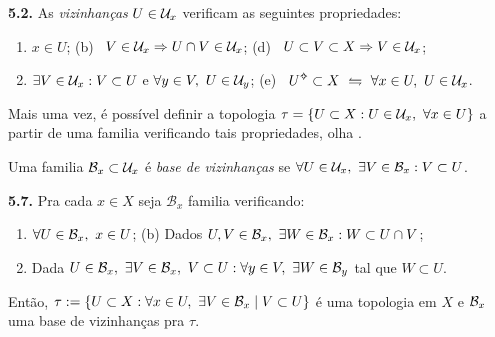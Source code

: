 \hypertarget{prop52}{}
\begin{proposition}
    \textbf{5.2.} As \emph{vizinhanças} \(U \in \mathcal{U}_x\) verificam as seguintes propriedades: 
\vspace{-0.2cm}
    \begin{enumerate}[label = (\alph*), left = 0.6cm]
        \item \(x \in U\); \hfill  (b) \ \( V \in \mathcal{U}_x \Rightarrow U\cap V \in \mathcal{U}_x\); \hfill (d) \ \(U \subset V\subset X \Rightarrow V \in \mathcal{U}_x\);
        \item[(c)] \(\exists V \in \mathcal{U}_x : V\subset U\) e \(\forall y \in V, \ U \in \mathcal{U}_y\); \hfill (e) \  \(U\ab\subset X \ \leftrightharpoons \ \forall x \in U, \  U \in \U_x\). 
    \end{enumerate}
\end{proposition}
\begin{note}
    Mais uma vez, é possível definir a topologia \(\tau = \{U \subset X : U \in \mathcal{U}_x, \ \forall x \in U\}\) a partir de uma familia verificando tais propriedades, olha \cite[pag. 12]{mujica2005}.
\end{note}

\begin{definition}
    Uma familia \(\mathcal{B}_x\subset \mathcal{U}_x\) é \emph{base de vizinhanças} se \(\forall U \in \mathcal{U}_x, \ \exists V \in \mathcal{B}_x : V \subset U\). 
\end{definition}

\begin{proposition}
    \textbf{5.7.} Pra cada \(x \in X \) seja \(\mathcal{B}_x\) familia verificando: 
    \vspace{-0.2cm}
    \begin{enumerate}[label = (\alph*), left = 0.6cm ]
        \item \(\forall U \in \mathcal{B}_x, \ x \in U\); \hfill (b) Dados \(U,V \in \mathcal{B}_x, \ \exists W \in \mathcal{B}_x : W \subset U \cap V\); %
        \item[(c)] Dada \(U \in \mathcal{B}_x, \ \exists V \in \mathcal{B}_x, \ V\subset U : \forall y \in V, \ \exists W \in \mathcal{B}_y \) tal que \( W \subset U\). 
    \end{enumerate}
    Então, \(\tau := \{U \subset X : \forall x \in U, \ \exists V \in \mathcal{B}_x \mid V \subset U\}\) é uma topologia em \(X\) e \(\mathcal{B}_x\) uma base de vizinhanças pra \(\tau\). 
\end{proposition}

